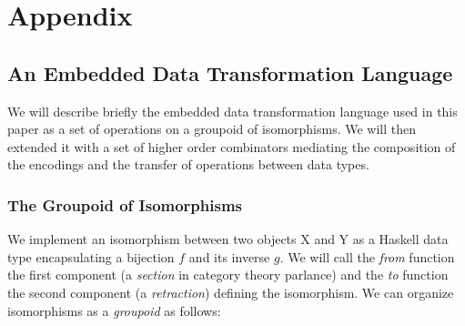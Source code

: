 \begin{comment}
\pdfoutput=1
\documentclass[]{INCLUDES/llncs}
\usepackage{TOOLS/dcpic,pictexwd}

\title{
    Appendix
}
\author{}
\institute{}
\end{comment}

%

\begin{comment}
In \cite{sac09fISO} an embedded
data transformation language is introduced, specified as a set of operations
on a groupoid of isomorphisms connecting various data types. To make the paper
self-contained as a literate Haskell program, we will provide in the
{\tt Appendix} the relevant subset of the commented code described in full
detail in \cite{sac09fISO}.
\end{comment}

\begin{comment}
\begin{code}
module ISO0 where
\end{code}
\end{comment}

\section*{Appendix}

\subsection*{An Embedded Data Transformation Language}

We will describe briefly the embedded data transformation language used in
this paper as a set of operations on a groupoid of isomorphisms. We will
then extended it with a set of higher order combinators mediating the
composition of the encodings and the transfer of operations between 
data types.

\subsubsection*{The Groupoid of Isomorphisms}

We implement an isomorphism between two objects X and Y as a 
Haskell data type encapsulating a bijection $f$ and its inverse $g$. 
We will call the {\em from} function the first component (a {\em
section} in category theory parlance) and
the {\em to} function the second component (a {\em retraction}) defining
the isomorphism.
We can organize isomorphisms as a {\em groupoid} as follows:

